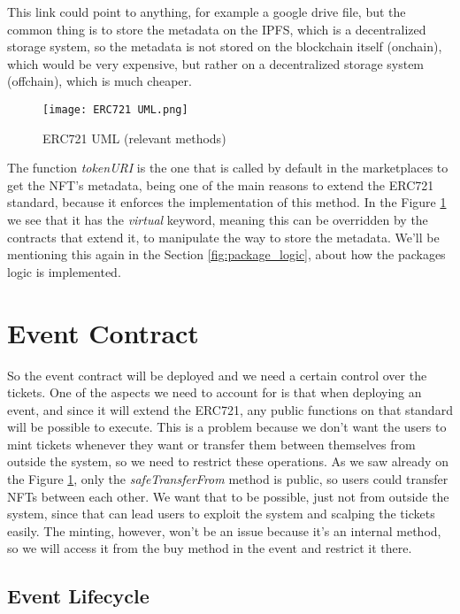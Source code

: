 This link could point to anything, for example a google drive file, but the
common thing is to store the metadata on the IPFS, which is a decentralized
storage system, so the metadata is not stored on the blockchain itself
(onchain), which would be very expensive, but rather on a decentralized storage
system (offchain), which is much cheaper.

\begin{figure}[H]
	\texttt{[image: ERC721 UML.png]}
	\centering
	\caption{ERC721 UML (relevant methods)}
	\label{fig:erc721_uml}
\end{figure}

The function \textit{tokenURI} is the one that is called by default in the
marketplaces to get the NFT's metadata, being one of the main reasons to extend
the ERC721 standard, because it enforces the implementation of this method. In
the Figure \ref{fig:erc721_uml} we see that it has the \textit{virtual}
keyword, meaning this can be overridden by the contracts that extend it, to
manipulate the way to store the metadata. We'll be mentioning this again in the
Section \ref{fig:package_logic}, about how the packages logic is implemented.

\section{Event Contract}
\label{sec:event_contract}

So the event contract will be deployed and we need a certain control over the
tickets. One of the aspects we need to account for is that when deploying an
event, and since it will extend the ERC721, any public functions on that
standard will be possible to execute. This is a problem because we don't want
the users to mint tickets whenever they want or transfer them between
themselves from outside the system, so we need to restrict these operations. As
we saw already on the Figure \ref{fig:erc721_uml}, only the
\textit{safeTransferFrom} method is public, so users could transfer NFTs
between each other. We want that to be possible, just not from outside the
system, since that can lead users to exploit the system and scalping the
tickets easily. The minting, however, won't be an issue because it's an
internal method, so we will access it from the buy method in the event and
restrict it there.

\subsection{Event Lifecycle}
\label{subsec:event_lifecycle}


